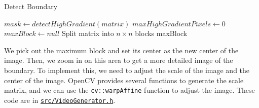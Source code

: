 \begin{algorithm}[H]
    \SetAlgoLined
    \caption{Detect Boundary}
    \label{alg:detect_boundary}
    $mask \leftarrow detectHighGradient(matrix)$\;
    $maxHighGradientPixels \leftarrow 0$\;
    $maxBlock \leftarrow null$\;
    Split matrix into $n \times n$ blocks\;
    \Return maxBlock\;
\end{algorithm}

We pick out the maximum block and set its center as the new center of the image.
Then, we zoom in on this area to get a more detailed image of the boundary.
To implement this, we need to adjust the scale of the image and the center of the image.
OpenCV provides several functions to generate the scale matrix, and we can use the \texttt{cv::warpAffine}
function to adjust the image.
These code are in
\href{https://github.com/AI1379/MandelbrotSet/blob/master/src/VideoGenerator.h}{\texttt{src/VideoGenerator.h}}.